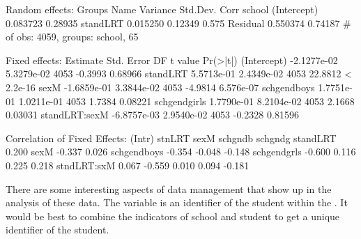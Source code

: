 \documentclass[12pt]{article}
\begin{document}
\begin{Schunk}
\begin{Soutput}
Random effects:
 Groups   Name        Variance Std.Dev. Corr  
 school   (Intercept) 0.083723 0.28935        
          standLRT    0.015250 0.12349  0.575 
 Residual             0.550374 0.74187        
# of obs: 4059, groups: school, 65

Fixed effects:
                 Estimate  Std. Error   DF t value  Pr(>|t|)
(Intercept)   -2.1277e-02  5.3279e-02 4053 -0.3993   0.68966
standLRT       5.5713e-01  2.4349e-02 4053 22.8812 < 2.2e-16
sexM          -1.6859e-01  3.3844e-02 4053 -4.9814 6.576e-07
schgendboys    1.7751e-01  1.0211e-01 4053  1.7384   0.08221
schgendgirls   1.7790e-01  8.2104e-02 4053  2.1668   0.03031
standLRT:sexM -6.8757e-03  2.9540e-02 4053 -0.2328   0.81596

Correlation of Fixed Effects:
            (Intr) stnLRT sexM   schgndb schgndg
standLRT     0.200                              
sexM        -0.337  0.026                       
schgendboys -0.354 -0.048 -0.148                
schgendgrls -0.600  0.116  0.225  0.218         
stndLRT:sxM  0.067 -0.559  0.010  0.094  -0.181 
\end{Soutput}
\end{Schunk}

There are some interesting aspects of data management that show up in
the analysis of these data.  The  variable is an
identifier of the student within the .  It would be best
to combine the indicators of school and student to get a unique
identifier of the student.
\end{document}
